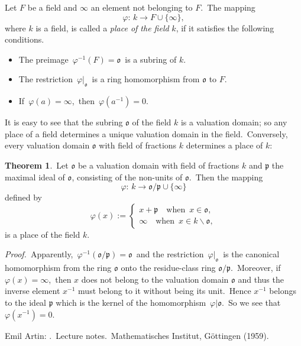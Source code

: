 \documentclass[12pt]{article}
\theoremstyle{definition}
\newtheorem*{thmplain}{Theorem}
\begin{document}
Let $F$ be a field and $\infty$ an element not belonging to $F$.\, The mapping
               $$\varphi: \,k\to F\cup\{\infty\},$$
where $k$ is a field, is called a {\em place of the field} $k$, if it satisfies the following conditions.
\begin{itemize}
 \item The preimage\, $\varphi^{-1}(F) = \mathfrak{o}$\, is a subring of $k$.
 \item The restriction\, $\varphi|_\mathfrak{o}$\, is a ring homomorphism from $\mathfrak{o}$ to $F$.
 \item If\, $\varphi(a) = \infty$,\, then\, $\varphi(a^{-1}) = 0$.
\end{itemize}

It is easy to see that the subring $\mathfrak{o}$ of the field $k$ is a valuation domain; so any place of a field determines a unique valuation domain in the field.\, Conversely, every valuation domain $\mathfrak{o}$ with field of fractions $k$ determines a place of $k$:

\begin{thmplain}
\,Let $\mathfrak{o}$ be a valuation domain with field of fractions $k$ and $\mathfrak{p}$ the maximal ideal of $\mathfrak{o}$, consisting of the non-units of $\mathfrak{o}$.\, Then the mapping
   $$\varphi: \,k\to \mathfrak{o/p}\cup\{\infty\}$$
defined by
$$
\varphi(x):=
\begin{cases}
x+\mathfrak{p} \quad \mathrm{when} \,\,\, x \in\mathfrak{o}, \\
\infty \quad \mathrm{when} \,\,\, x \in k\smallsetminus\mathfrak{o},
\end{cases}
$$
is a place of the field $k$.
\end{thmplain}

{\em Proof.}\, Apparently,\, $\varphi^{-1}(\mathfrak{o/p}) = \mathfrak{o}$\, and the restriction\, $\varphi|_\mathfrak{o}$\, is the canonical homomorphism from the ring $\mathfrak{o}$ onto the residue-class ring $\mathfrak{o/p}$.\, Moreover, if\, $\varphi(x) = \infty$,\, then $x$ does not belong to the valuation domain $\mathfrak{o}$ and thus the inverse element $x^{-1}$ must belong to it without being its unit.\, Hence $x^{-1}$ belongs to the ideal $\mathfrak{p}$ which is the kernel of the homomorphism\, 
$\varphi|\mathfrak{o}$.\, So we see that\, $\varphi(x^{-1}) = 0$.

\begin{thebibliography}{7}
 Emil Artin: {\em {}}.\, Lecture notes.\, Mathematisches Institut, G\"ottingen (1959).
\end{thebibliography}
\end{document}
